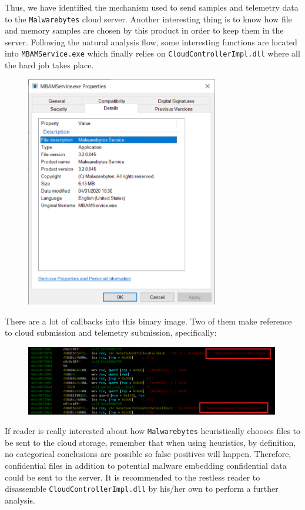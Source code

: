 Thus, we have identified the mechanism used to send samples and telemetry data
to the \texttt{Malwarebytes} cloud server. Another interesting thing is to
know how file and memory samples are chosen by this product in order to keep
them in the server. Following the natural analysis flow, some interesting
functions are located into \texttt{MBAMService.exe} which finally relies on
\texttt{CloudControllerImpl.dll} where all the hard job takes place.
\begin{figure}[h]
  \centering
  \includegraphics[width=0.75\textwidth]{./figures/MBAMService}
\end{figure}

There are a lot of callbacks into this binary image. Two of them make
reference to cloud submission and telemetry submission, specifically:
\begin{figure}[h]
  \centering
  \includegraphics[width=0.99\textwidth]{./figures/Callbacks}
\end{figure}

If reader is really interested about how \texttt{Malwarebytes} heuristically
chooses files to be sent to the cloud storage, remember that when using
heuristics, by definition, no categorical conclusions are possible so false
positives will happen. Therefore, confidential files in addition to potential
malware embedding confidential data could be sent to the server. It is
recommended to the restless reader to disassemble
\texttt{CloudControllerImpl.dll} by his/her own to perform a further analysis.

